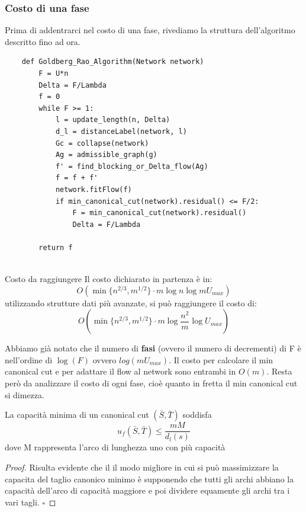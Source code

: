 \documentclass[a4paper, 11pt]{report}
\newcommand*{\QED}{\null\nobreak\hfill\ensuremath{\square}}%
\begin{document}
    \subsubsection{Costo di una fase}
    Prima di addentrarci nel costo di una fase, rivediamo la struttura dell'algoritmo descritto fino ad ora.
    \begin{verbatim}
    def Goldberg_Rao_Algorithm(Network network)
        F = U*n
        Delta = F/Lambda
        f = 0
        while F >= 1:
            l = update_length(n, Delta)
            d_l = distanceLabel(network, l)
            Gc = collapse(network)
            Ag = admissible_graph(g)
            f' = find_blocking_or_Delta_flow(Ag)
            f = f + f'
            network.fitFlow(f)
            if min_canonical_cut(network).residual() <= F/2: 
                F = min_canonical_cut(network).residual()
                Delta = F/Lambda

        return f
        
    \end{verbatim}
    \begin{remark}
        {Costo da raggiungere}{}
        Il costo dichiarato in partenza è in:
        \[O(\min \{n^{2/3}, m^{1/2}\}\cdot m \log n\log m U_{max})\]
        utilizzando strutture dati più avanzate, si può raggiungere il costo di:
        \[O(\min \{n^{2/3}, m^{1/2}\}\cdot m \log \frac{n^2}{m}\log U_{max})\]

    \end{remark}
    Abbiamo già notato che il numero di \textbf{fasi} (ovvero il numero di decrementi) di F è nell'ordine di $\log(F)$ ovvero $log(m U_{max})$.
    Il costo per calcolare il min canonical cut e per adattare il flow al network sono entrambi in $O(m)$.
    Resta però da analizzare il costo di ogni fase, cioè quanto in fretta il min canonical cut si dimezza.
    \begin{lemma}
        {}{}
        La capacità minima di un canonical cut $(\bar{S}, \bar{T})$ soddisfa
        \[u_f(\bar{S}, \bar{T})\le \frac{mM}{d_l(s)}\]
        dove M rappresenta l'arco di lunghezza uno con più capacità
    \end{lemma}
    \begin{proof}
        Risulta evidente che il il modo migliore in cui si può massimizzare la capacita del taglio canonico minimo è supponendo che tutti gli archi abbiano la capacità dell'arco di capacità maggiore e poi dividere equamente gli archi tra i vari tagli.
    \QED
    \end{proof}
\end{document}
